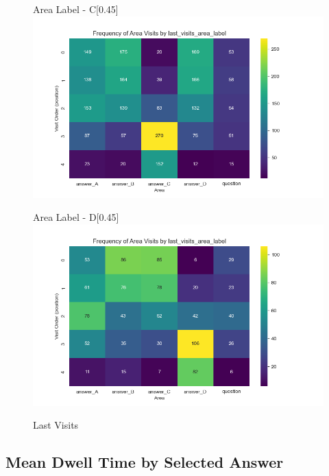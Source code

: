 \documentclass{article}
\begin{document}
\begin{figure}[H]
          \begin{subcaptionbox}{Area Label - C\label{fig:c4}}[0.45\textwidth]
            {\centering\includegraphics[width=\linewidth]{plots/visits/matrix__last_visits_area_label_hunters_C.png}}
          \end{subcaptionbox}
          \hfill
          \begin{subcaptionbox}{Area Label - D\label{fig:d4}}[0.45\textwidth]
            {\centering\includegraphics[width=\linewidth]{plots/visits/matrix__last_visits_area_label_hunters_D.png}}
          \end{subcaptionbox}
          
          \caption{Last Visits}
          \label{fig:last_hunt_lbl}
        \end{figure}
    
    
    \subsection{Mean Dwell Time by Selected Answer}
\end{document}
